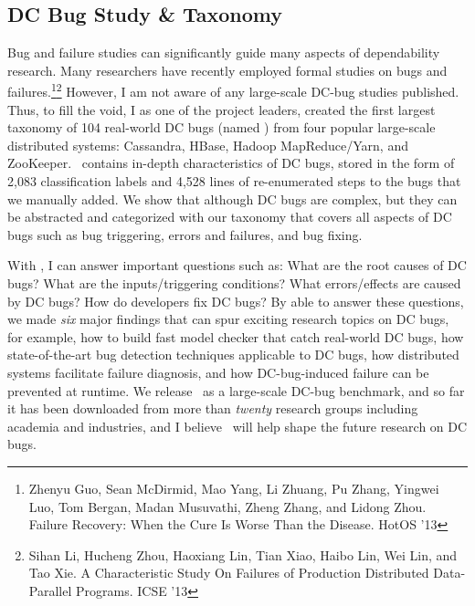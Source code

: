 \documentclass[10pt]{article}
\begin{document}
\subsection{DC Bug Study \& Taxonomy} 

Bug and failure studies can significantly guide many aspects of dependability
research. Many researchers have recently employed formal studies on bugs and
failures.\footnote{Zhenyu Guo, Sean McDirmid, Mao Yang, Li Zhuang, Pu Zhang,
Yingwei Luo, Tom Bergan, Madan Musuvathi, Zheng Zhang, and Lidong Zhou. Failure
Recovery: When the Cure Is Worse Than the Disease. HotOS '13}\footnote{Sihan Li,
Hucheng Zhou, Haoxiang Lin, Tian Xiao, Haibo Lin, Wei Lin, and Tao Xie. A
Characteristic Study On Failures of Production Distributed Data-Parallel
Programs. ICSE '13}
%
However, I am not aware of any large-scale DC-bug studies published.  Thus, to
fill the void, I as one of the project leaders, created the first largest
taxonomy of 104 real-world DC bugs (named \taxdc)
\cite{Leesatapornwongsa+16-TaxDC} from four popular large-scale distributed
systems: Cassandra, HBase, Hadoop MapReduce/Yarn, and ZooKeeper.  \taxdc\
contains in-depth characteristics of DC bugs, stored in the form of 2,083
classification labels and 4,528 lines of re-enumerated steps to the bugs that we
manually added. We show that although DC bugs are complex, but they can be
abstracted and categorized with our taxonomy that covers all aspects of DC bugs
such as bug triggering, errors and failures, and bug fixing.


%


With \taxdc, I can answer important questions such as: 
%
What are the root causes of DC bugs?
%
What are the inputs/triggering conditions? 
%
What errors/effects are caused by DC bugs?
%
How do developers fix DC bugs? 
%
By able to answer these questions, we made \textit{six} major findings that can
spur exciting research topics on DC bugs, for example, how to build fast model
checker that catch real-world DC bugs, how state-of-the-art
bug detection techniques applicable to DC bugs, how distributed systems
facilitate failure diagnosis, and how DC-bug-induced failure can be prevented at
runtime.
%
We release \taxdc\ as a large-scale DC-bug benchmark, and so far it has been
downloaded from more than \textit{twenty} research groups including academia and
industries, and I believe \taxdc\ will help shape the future research on DC bugs.
\end{document}
